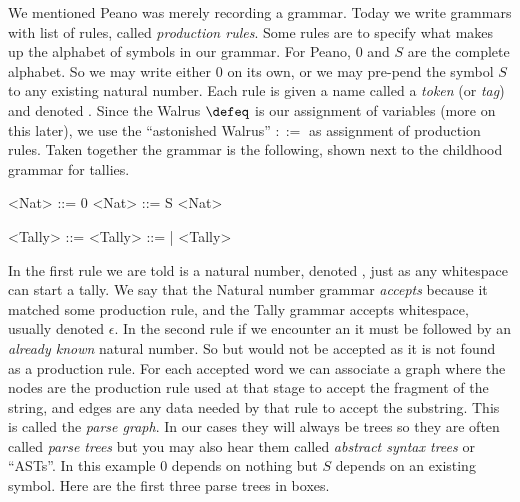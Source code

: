 We mentioned Peano was merely recording a grammar.  Today we write grammars with
list of rules, called \emph{production rules}.  Some rules are to specify what
makes up the alphabet of symbols in our grammar.  For Peano, $0$ and $S$ are the
complete alphabet.  So we may write either $0$ on its own, or we may pre-pend
the symbol $S$ to any existing natural number.  Each rule is given a name called
a \emph{token} (or \emph{tag}) and denoted . Since the Walrus
$\defeq$ is our assignment of variables (more on this later), we use the
``astonished Walrus'' $::=$ as assignment of production rules.   Taken together
the grammar is the following, shown next to the childhood grammar for tallies.
\begin{center}
\begin{minipage}{0.4\textwidth}
\begin{gcode}[]
<Nat> ::= 0 
<Nat> ::= S <Nat>
\end{gcode}
\end{minipage}
\hfill
\begin{minipage}{0.45\textwidth}
\begin{gcode}[]
<Tally> ::=  
<Tally> ::= | <Tally>
\end{gcode}
\end{minipage}
\end{center}
In the first rule we are told  is a natural number, denoted
, just as any whitespace can start a tally. We say that the Natural
number grammar \emph{accepts}  because it matched some production rule,
and the Tally grammar accepts whitespace, usually denoted $\epsilon$.  In the
second rule if we encounter an  it must be followed by an \emph{already
known} natural number.  So  but  would not be accepted as
it is not found as a production rule.  For each accepted word we can associate 
a graph where the nodes are the production rule used at that stage to accept 
the fragment of the string, and edges are any data needed by that rule to 
accept the substring.  This is called the \emph{parse graph}.  In our 
cases they will always be trees so they are often called \emph{parse trees}
but you may also hear them called \emph{abstract syntax trees} or ``ASTs''.  In this example $0$ depends on nothing but $S$ depends
on an existing symbol.  Here are the first three parse trees in boxes.
